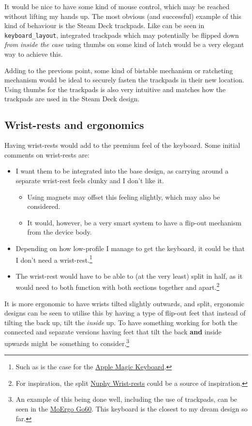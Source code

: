 \documentclass[11pt,a4paper]{article}
\numberwithin{equation}{section}
\begin{document}
It would be nice to have some kind of mouse control, which may be reached without lifting my hands up. The most obvious (and successful) example of this kind of behaviour is the Steam Deck trackpads. Like can be seen in \texttt{keyboard\_layout}, integrated trackpads which may potentially be flipped down \textit{from inside the case} using thumbs on some kind of latch would be a very elegant way to achieve this.

Adding to the previous point, some kind of bistable mechanism or ratcheting mechanism would be ideal to securely fasten the trackpads in their new location. Using thumbs for the trackpads is also very intuitive and matches how the trackpads are used in the Steam Deck design.

\subsection{Wrist-rests and ergonomics}

Having wrist-rests would add to the premium feel of the keyboard. Some initial comments on wrist-rests are:
\begin{itemize}
    \item I want them to be integrated into the base design, as carrying around a separate wrist-rest feels clunky and I don't like it.
    \begin{itemize}
        \item Using magnets may offset this feeling slightly, which may also be considered.
        \item It would, however, be a very smart system to have a flip-out mechanism from the device body.
    \end{itemize}
    \item Depending on how low-profile I manage to get the keyboard, it could be that I don't need a wrist-rest.\footnote{Such as is the case for the \href{https://www.apple.com/uk/shop/product/mxcl3b/a/magic-keyboard-usb-c-british-english}{Apple Magic Keyboard}.}
    \item The wrist-rest would have to be able to (at the very least) split in half, as it would need to both function with both sections together and apart.\footnote{For inspiration, the split \href{https://nuphy.com/products/wrist-rest-for-node-series-low-profile?variant=43916448137325}{Nuphy Wrist-rests} could be a source of inspiration.}
\end{itemize}
It is more ergonomic to have wrists tilted slightly outwards, and split, ergonomic designs can be seen to utilise this by having a type of flip-out feet that instead of tilting the back up, tilt the \textit{inside} up. To have something working for both the connected and separate versions having feet that tilt the back \textbf{and} inside upwards might be something to consider.\footnote{An example of this being done well, including the use of trackpads, can be seen in the \href{https://www.youtube.com/watch?v=mYT5AyVAzE8&list=PLphYY91fy6YT2JWb0fiL8VznQWKgOIwTe&index=29}{MoErgo Go60}. This keyboard is the closest to my dream design so far.}
\end{document}
